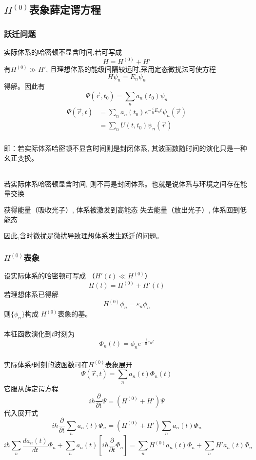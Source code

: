 \subsection{$H^{(0)}$表象薛定谔方程}
\begin{frame} 
  \frametitle{跃迁问题}
实际体系的哈密顿不显含时间,若可写成
\[H = H^{(0)} + H'\]
有$H^{(0)} \gg H'$, 且理想体系的能级间隔较远时,采用定态微扰法可使方程
\[ H\psi _n = E_n \psi _n\]
得解。因此有 
\[ \Psi(\vec{r},t_0) = \sum_n a_n(t_0) \psi _n\]
\[ 
\begin{aligned}
  \Psi(\vec{r},t)
  &= \sum_n a_n(t_0)e^{-\frac{i}{\hbar}E_n t} \psi _n (\vec{r}) \\
  &= \sum_n U(t,t_0) \psi _n (\vec{r}) 
\end{aligned} \]
\end{frame} 

\begin{frame} 
  \frametitle{}
即：若实际体系哈密顿不显含时间则是封闭体系, 其波函数随时间的演化只是一种幺正变换。

~~\\ 
若实际体系哈密顿显含时间, 则不再是封闭体系。也就是说体系与环境之间存在能量交换 
\begin{itemize}
  \Item 获得能量（吸收光子）, 体系被激发到高能态
  \Item 失去能量（放出光子）, 体系回到低能态
\end{itemize}
因此,含时微扰是微扰导致理想体系发生跃迁的问题。
\end{frame} 

\begin{frame} 
  \frametitle{ $H^{(0)}$表象}
设实际体系的哈密顿可写成 （$H'(t)\ll H^{(0)} $）
\[H(t) = H^{(0)} + H'(t)\]
若理想体系已得解
\[H^{(0)}\phi _n = \varepsilon _n \phi _n \]
则$\{\phi _n\}$构成 $H^{(0)}$表象的基。 \\
~~\\ 
本征函数演化到$t$时刻为
\[ \Phi _n(t) =  \phi _n e^{-\frac{i}{\hbar}\varepsilon _n t}\]
\end{frame} 

\begin{frame} 
  \frametitle{}
实际体系$t$时刻的波函数可在$H^{(0)}$表象展开
\begin{equation}\label{eq:twave}
  \Psi(\vec{r},t) =\sum_n a_n(t) \Phi _n(t) 
\end{equation}
它服从薛定谔方程
\[ i \hbar \frac{\partial }{\partial t}\Psi =(H^{(0)} +H' )\Psi\]
代入展开式
\[ i \hbar \frac{\partial }{\partial t}\sum_n a_n(t) \Phi _n  =(H^{(0)} +H' )\sum_n a_n(t) \Phi _n \]
\[ i \hbar \sum_n \frac{d a_n(t)}{d t} \Phi _n + \sum_n a_n(t) \left[i \hbar \frac{\partial }{\partial t} \Phi _n\right]  =\sum_n H^{(0)}a_n(t) \Phi _n +  \sum_n H' a_n(t) \Phi _n \]
\end{frame} 

